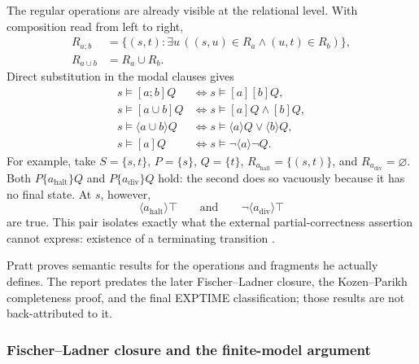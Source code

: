 The regular operations are already visible at the relational level.  With
composition read from left to right,
\[
\begin{aligned}
 R_{a;b}
   &=\{(s,t):\exists u\,((s,u)\in R_a\land(u,t)\in R_b)\},\\
 R_{a\cup b}&=R_a\cup R_b.
\end{aligned}
\]
Direct substitution in the modal clauses gives
\[
\begin{aligned}
 s\models[a;b]Q
   &\Longleftrightarrow s\models[a][b]Q,\\
 s\models[a\cup b]Q
   &\Longleftrightarrow s\models[a]Q\land[b]Q,\\
 s\models\langle a\cup b\rangle Q
   &\Longleftrightarrow
     s\models\langle a\rangle Q\lor\langle b\rangle Q,\\
 s\models[a]Q
   &\Longleftrightarrow s\models\neg\langle a\rangle\neg Q.
\end{aligned}
\]
For example, take \(S=\{s,t\}\), \(P=\{s\}\), \(Q=\{t\}\),
\(R_{a_{\mathrm{halt}}}=\{(s,t)\}\), and
\(R_{a_{\mathrm{div}}}=\varnothing\).  Both
\(P\{a_{\mathrm{halt}}\}Q\) and \(P\{a_{\mathrm{div}}\}Q\) hold: the second
does so vacuously because it has no final state.  At \(s\), however,
\[
 \langle a_{\mathrm{halt}}\rangle\top
 \qquad\text{and}\qquad
 \neg\langle a_{\mathrm{div}}\rangle\top
\]
are true.  This pair isolates exactly what the external partial-correctness
assertion cannot express: existence of a terminating transition
\cite[technical-report pp.~4--10]{Pratt1976}.

Pratt proves semantic results for the operations and fragments he actually
defines.  The report predates the later Fischer--Ladner closure, the
Kozen--Parikh completeness proof, and the final EXPTIME classification; those
results are not back-attributed to it.

\subsubsection{Fischer--Ladner closure and the finite-model argument}

